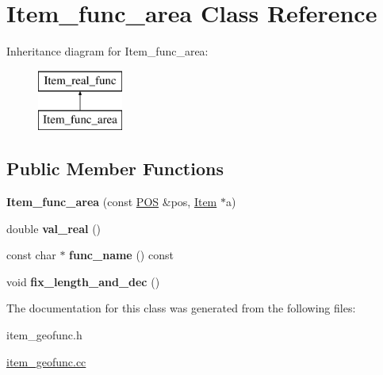 \hypertarget{classItem__func__area}{}\section{Item\+\_\+func\+\_\+area Class Reference}
\label{classItem__func__area}
Inheritance diagram for Item\+\_\+func\+\_\+area\+:\begin{figure}[H]
\begin{center}
\leavevmode
\includegraphics[height=2.000000cm]{classItem__func__area}
\end{center}
\end{figure}
\subsection*{Public Member Functions}
\begin{DoxyCompactItemize}
\item 
\mbox{\label{classItem__func__area_aae2acb079b7b26bd7d1de7ec514a40f8}} 
{\bfseries Item\+\_\+func\+\_\+area} (const \mbox{\hyperlink{structYYLTYPE}{P\+OS}} \&pos, \mbox{\hyperlink{classItem}{Item}} $\ast$a)
\item 
\mbox{\label{classItem__func__area_a197466898fe04d78c2c77773ddaf9002}} 
double {\bfseries val\+\_\+real} ()
\item 
\mbox{\label{classItem__func__area_a5b35dd68855d01d93205b63c5404efe1}} 
const char $\ast$ {\bfseries func\+\_\+name} () const
\item 
\mbox{\label{classItem__func__area_a1319bc17d787b7413faf124f4bac9e1d}} 
void {\bfseries fix\+\_\+length\+\_\+and\+\_\+dec} ()
\end{DoxyCompactItemize}


The documentation for this class was generated from the following files\+:\begin{DoxyCompactItemize}
\item 
item\+\_\+geofunc.\+h\item 
\mbox{\hyperlink{item__geofunc_8cc}{item\+\_\+geofunc.\+cc}}\end{DoxyCompactItemize}
